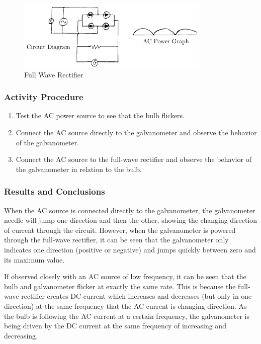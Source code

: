 \begin{figure}
\begin{center}
\includegraphics{./img/full-wave-rectifier.png}
\caption{Full Wave Rectifier}
\label{fig:full-wave-rectifier}
\end{center}
\end{figure}

\subsubsection*{Activity Procedure}
\begin{enumerate}
\item{Test the AC power source to see that the bulb flickers.}
\item{Connect the AC source directly to the galvanometer and observe the behavior of the galvanometer.}
\item{Connect the AC source to the full-wave rectifier and observe the behavior of the galvanometer in relation to the bulb.}
\end{enumerate}

\subsubsection*{Results and Conclusions}
When the AC source is connected directly to the galvanometer, the galvanometer needle will jump one direction and then the other, showing the changing direction of current through the circuit.  However, when the galvanometer is powered through the full-wave rectifier, it can be seen that the galvanometer only indicates one direction (positive or negative) and jumps quickly between zero and its maximum value.

If observed closely with an AC source of low frequency, it can be seen that the bulb and galvanometer flicker at exactly the same rate.  This is because the full-wave rectifier creates DC current which increases and decreases (but only in one direction) at the same frequency that the AC current is changing direction.  As the bulb is following the AC current at a certain frequency, the galvanometer is being driven by the DC current at the same frequency of increasing and decreasing.

